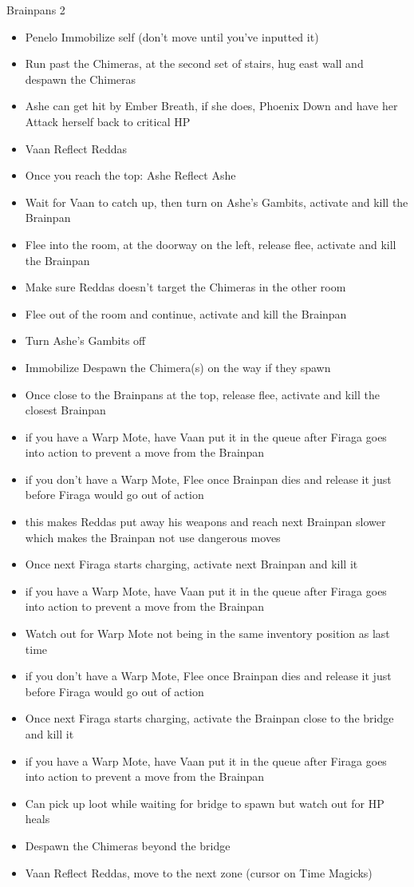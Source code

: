 \begin{battle}{Brainpans 2}
\begin{itemize}
	\item  Penelo Immobilize self (don't move until you've inputted it)
	\item  Run past the Chimeras, at the second set of stairs, hug east wall and despawn the Chimeras
		\item  Ashe can get hit by Ember Breath, if she does, Phoenix Down and have her Attack herself back to critical HP
	\item  Vaan Reflect Reddas
	\item  Once you reach the top: Ashe Reflect Ashe
	\item  Wait for Vaan to catch up, then turn on Ashe's Gambits, activate and kill the Brainpan
	\item  Flee into the room, at the doorway on the left, release flee, activate and kill the Brainpan
		\item  Make sure Reddas doesn't target the Chimeras in the other room
	\item  Flee out of the room and continue, activate and kill the Brainpan
		\item  Turn Ashe's Gambits off
	\item  Immobilize Despawn the Chimera(s) on the way if they spawn
	\item  Once close to the Brainpans at the top, release flee, activate and kill the closest Brainpan
		\item  if you have a Warp Mote, have Vaan put it in the queue after Firaga goes into action to prevent a move from the Brainpan
		\item  if you don't have a Warp Mote, Flee once Brainpan dies and release it just before Firaga would go out of action
			\item  this makes Reddas put away his weapons and reach next Brainpan slower which makes the Brainpan not use dangerous moves
	\item  Once next Firaga starts charging, activate next Brainpan and kill it
		\item  if you have a Warp Mote, have Vaan put it in the queue after Firaga goes into action to prevent a move from the Brainpan
			\item  Watch out for Warp Mote not being in the same inventory position as last time
		\item  if you don't have a Warp Mote, Flee once Brainpan dies and release it just before Firaga would go out of action
	\item  Once next Firaga starts charging, activate the Brainpan close to the bridge and kill it
		\item  if you have a Warp Mote, have Vaan put it in the queue after Firaga goes into action to prevent a move from the Brainpan
	\item  Can pick up loot while waiting for bridge to spawn but watch out for HP heals
	\item  Despawn the Chimeras beyond the bridge 
	\item  Vaan Reflect Reddas, move to the next zone (cursor on Time Magicks)
	\end{itemize}
\end{battle}
